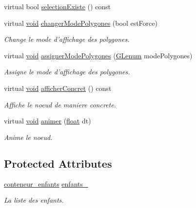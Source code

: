 \begin{DoxyCompactItemize}
virtual bool \hyperlink{group__inf2990_ga38f910a0d19bb3d091daa285ad91cd8a}{selection\-Existe} () const 
\item 
virtual \hyperlink{wglew_8h_aeea6e3dfae3acf232096f57d2d57f084}{void} \hyperlink{group__inf2990_gafcbaa01f832fc2dad13b363253963d0b}{changer\-Mode\-Polygones} (bool est\-Force)
\begin{DoxyCompactList}\small\item\em Change le mode d'affichage des polygones. \end{DoxyCompactList}\item 
virtual \hyperlink{wglew_8h_aeea6e3dfae3acf232096f57d2d57f084}{void} \hyperlink{group__inf2990_gaeeeca055ef6aef0435b9956eb467ff7f}{assigner\-Mode\-Polygones} (\hyperlink{glew_8h_a5d5233918a454ad3975c620a69ac5f0b}{G\-Lenum} mode\-Polygones)
\begin{DoxyCompactList}\small\item\em Assigne le mode d'affichage des polygones. \end{DoxyCompactList}\item 
virtual \hyperlink{wglew_8h_aeea6e3dfae3acf232096f57d2d57f084}{void} \hyperlink{group__inf2990_gad440d00734a92e1bd99cdee2ac62bb68}{afficher\-Concret} () const 
\begin{DoxyCompactList}\small\item\em Affiche le noeud de maniere concrete. \end{DoxyCompactList}\item 
virtual \hyperlink{wglew_8h_aeea6e3dfae3acf232096f57d2d57f084}{void} \hyperlink{group__inf2990_ga57f31e1a0fd79628d04651001014fd41}{animer} (\hyperlink{fmod_8h_aeb841aa4b4b5f444b5d739d865b420af}{float} dt)
\begin{DoxyCompactList}\small\item\em Anime le noeud. \end{DoxyCompactList}\end{DoxyCompactItemize}
\subsection*{Protected Attributes}
\begin{DoxyCompactItemize}
\item 
\hyperlink{class_noeud_composite_a697e52516e154d6943a1e1aa9533c317}{conteneur\-\_\-enfants} \hyperlink{class_noeud_composite_a628227fd324020e497ada7577457ff3f}{enfants\-\_\-}
\begin{DoxyCompactList}\small\item\em La liste des enfants. \end{DoxyCompactList}\end{DoxyCompactItemize}



